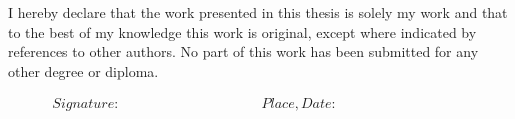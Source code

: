 \documentclass[10pt]{article}
\begin{document}
		\noindent I hereby declare that the work presented in this thesis is solely my work and that to the best of my
		knowledge this work is original, except where indicated by references to other authors. No part of this
		work has been submitted for any other degree or diploma. 
		
		\begin{displaymath}
		\begin{array}{ll}
		Signature:~~~~~~~~~~~~~~~~~~~~~~~~~~~~~~~~~~~~~~~~~~
		& Place, Date:~~~~~~~~~~~~~~~~~~~~~~~~~~~~~~~~~~~~~~~~~~
		\end{array}
		\end{displaymath}
\end{document}
